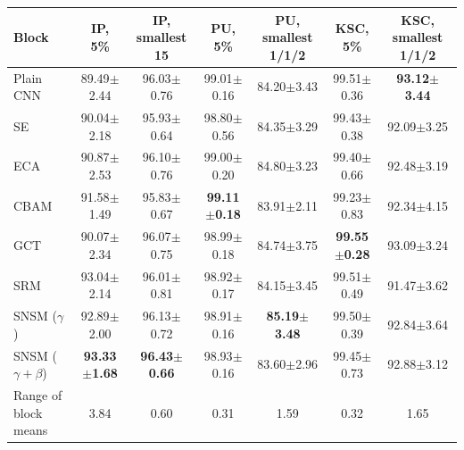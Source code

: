 \begin{tabular}{lcccccc}
\toprule
Block & IP, 5\% & IP, smallest 15 & PU, 5\% & PU, smallest 1/1/2 & KSC, 5\% & KSC, smallest 1/1/2 \\
\midrule
Plain CNN & 89.49$\pm$2.44 & 96.03$\pm$0.76 & 99.01$\pm$0.16 & 84.20$\pm$3.43 & 99.51$\pm$0.36 & \textbf{93.12$\pm$3.44} \\
SE & 90.04$\pm$2.18 & 95.93$\pm$0.64 & 98.80$\pm$0.56 & 84.35$\pm$3.29 & 99.43$\pm$0.38 & 92.09$\pm$3.25 \\
ECA & 90.87$\pm$2.53 & 96.10$\pm$0.76 & 99.00$\pm$0.20 & 84.80$\pm$3.23 & 99.40$\pm$0.66 & 92.48$\pm$3.19 \\
CBAM & 91.58$\pm$1.49 & 95.83$\pm$0.67 & \textbf{99.11$\pm$0.18} & 83.91$\pm$2.11 & 99.23$\pm$0.83 & 92.34$\pm$4.15 \\
GCT & 90.07$\pm$2.34 & 96.07$\pm$0.75 & 98.99$\pm$0.18 & 84.74$\pm$3.75 & \textbf{99.55$\pm$0.28} & 93.09$\pm$3.24 \\
SRM & 93.04$\pm$2.14 & 96.01$\pm$0.81 & 98.92$\pm$0.17 & 84.15$\pm$3.45 & 99.51$\pm$0.49 & 91.47$\pm$3.62 \\
SNSM ($\gamma$) & 92.89$\pm$2.00 & 96.13$\pm$0.72 & 98.91$\pm$0.16 & \textbf{85.19$\pm$3.48} & 99.50$\pm$0.39 & 92.84$\pm$3.64 \\
SNSM ($\gamma{+}\beta$) & \textbf{93.33$\pm$1.68} & \textbf{96.43$\pm$0.66} & 98.93$\pm$0.16 & 83.60$\pm$2.96 & 99.45$\pm$0.73 & 92.88$\pm$3.12 \\
\midrule
Range of block means & 3.84 & 0.60 & 0.31 & 1.59 & 0.32 & 1.65 \\
\bottomrule
\end{tabular}
